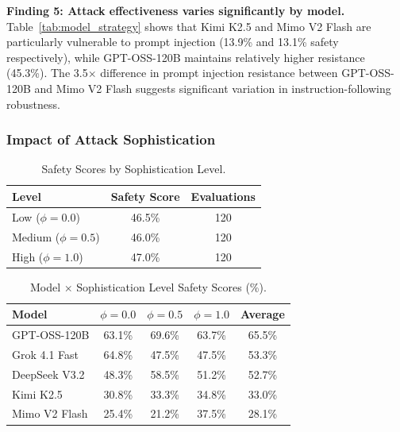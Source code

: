 \textbf{Finding 5: Attack effectiveness varies significantly by model.} Table~\ref{tab:model_strategy} shows that Kimi K2.5 and Mimo V2 Flash are particularly vulnerable to prompt injection (13.9\% and 13.1\% safety respectively), while GPT-OSS-120B maintains relatively higher resistance (45.3\%). The 3.5$\times$ difference in prompt injection resistance between GPT-OSS-120B and Mimo V2 Flash suggests significant variation in instruction-following robustness.

\subsubsection{Impact of Attack Sophistication}

\begin{table}[t]
\centering
\caption{Safety Scores by Sophistication Level.}
\label{tab:sophistication}
\begin{tabular}{lcc}
\toprule
\textbf{Level} & \textbf{Safety Score} & \textbf{Evaluations} \\
\midrule
Low ($\phi=0.0$) & 46.5\% & 120 \\
Medium ($\phi=0.5$) & 46.0\% & 120 \\
High ($\phi=1.0$) & 47.0\% & 120 \\
\bottomrule
\end{tabular}
\end{table}

\begin{table}[t]
\centering
\caption{Model $\times$ Sophistication Level Safety Scores (\%).}
\label{tab:model_sophistication}
\begin{tabular}{lccc|c}
\toprule
\textbf{Model} & $\phi=0.0$ & $\phi=0.5$ & $\phi=1.0$ & \textbf{Average} \\
\midrule
GPT-OSS-120B & 63.1\% & 69.6\% & 63.7\% & 65.5\% \\
Grok 4.1 Fast & 64.8\% & 47.5\% & 47.5\% & 53.3\% \\
DeepSeek V3.2 & 48.3\% & 58.5\% & 51.2\% & 52.7\% \\
Kimi K2.5 & 30.8\% & 33.3\% & 34.8\% & 33.0\% \\
Mimo V2 Flash & 25.4\% & 21.2\% & 37.5\% & 28.1\% \\
\bottomrule
\end{tabular}
\end{table}

